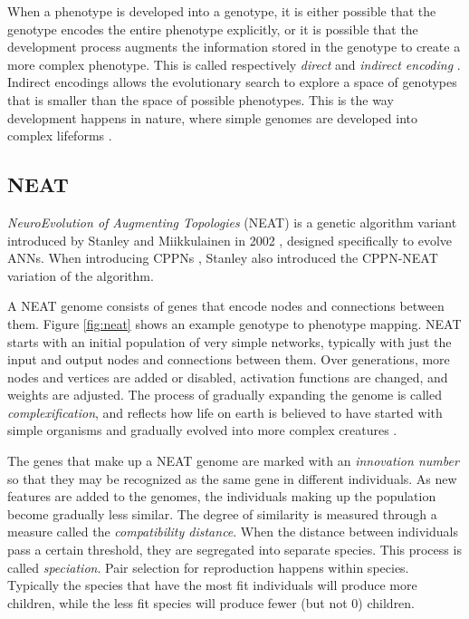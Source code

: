 When a phenotype is developed into a genotype, it is either possible that the genotype encodes the entire phenotype explicitly,
or it is possible that the development process augments the information stored in the genotype to create a more complex phenotype.
This is called respectively \textit{direct} and \textit{indirect encoding} \cite{clune2011performance}.
Indirect encodings allows the evolutionary search to explore a space of genotypes that is smaller than the space of possible phenotypes.
This is the way development happens in nature, where simple genomes are developed into complex lifeforms \cite{clune2011performance}.

\subsection{NEAT}
\textit{NeuroEvolution of Augmenting Topologies} (NEAT) is a genetic algorithm variant introduced by Stanley and Miikkulainen in 2002 \cite{stanley-2002},
designed specifically to evolve ANNs.
When introducing CPPNs \cite{stanley-2007}, Stanley also introduced the CPPN-NEAT variation of the algorithm.

A NEAT genome consists of genes that encode nodes and connections between them.
Figure \ref{fig:neat} shows an example genotype to phenotype mapping.
NEAT starts with an initial population of very simple networks, typically with just the input and output nodes and connections between them.
Over generations, more nodes and vertices are added or disabled, activation functions are changed, and weights are adjusted.
The process of gradually expanding the genome is called \textit{complexification},
and reflects how life on earth is believed to have started with simple organisms and gradually evolved into more complex creatures \cite{darnell1986speculations,pross2005emergence}.

The genes that make up a NEAT genome are marked with an \textit{innovation number} so that they may be recognized as the same gene in different individuals.
As new features are added to the genomes, the individuals making up the population become gradually less similar.
The degree of similarity is measured through a measure called the \textit{compatibility distance}.
When the distance between individuals pass a certain threshold, they are segregated into separate species.
This process is called \textit{speciation}.
Pair selection for reproduction happens within species.
Typically the species that have the most fit individuals will produce more children,
while the less fit species will produce fewer (but not 0) children.

